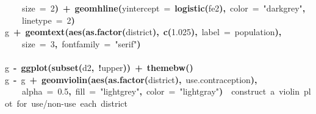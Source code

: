 \documentclass{article}
\makeatletter
\newcommand{\hlnumber}[1]{\textcolor[rgb]{0,0,0}{#1}}%
\newcommand{\hlfunctioncall}[1]{\textcolor[rgb]{.5,0,.33}{\textbf{#1}}}%
\newcommand{\hlstring}[1]{\textcolor[rgb]{.6,.6,1}{#1}}%
\newcommand{\hlkeyword}[1]{\textbf{#1}}%
\newcommand{\hlargument}[1]{\textcolor[rgb]{.69,.25,.02}{#1}}%
\newcommand{\hlcomment}[1]{\textcolor[rgb]{.18,.6,.34}{#1}}%
\newcommand{\hlassignement}[1]{\textbf{#1}}%
\newcommand{\hlsymbol}[1]{#1}%
\newcommand{\hlstd}[1]{\textcolor[rgb]{0,0,0}{#1}}%
\newenvironment{kframe}{%
 \def\FrameCommand##1{\hskip\@totalleftmargin \hskip-\fboxsep
 \colorbox{shadecolor}{##1}\hskip-\fboxsep
     \hskip-\linewidth \hskip-\@totalleftmargin \hskip\columnwidth}%
 \MakeFramed {\advance\hsize-\width
   \@totalleftmargin\z@ \linewidth\hsize
   \@setminipage}}%
 {\par\unskip\endMakeFramed}
\newenvironment{knitrout}{}{} %
\makeatother
\begin{document}
\begin{knitrout}
{\begin{kframe}
\begin{flushleft}
\hlstd{}{\ }{\ }{\ }{\ }\hlargument{size}{\ }\hlargument{=}{\ }\hlnumber{2}\hlkeyword{)}{\ }\hlkeyword{+}{\ }\hlfunctioncall{geom\usebox{\hlnormalsizeboxunderscore}hline}\hlkeyword{(}\hlargument{yintercept}{\ }\hlargument{=}{\ }\hlfunctioncall{logistic}\hlkeyword{(}\hlsymbol{fe2}\hlkeyword{)}\hlkeyword{,}{\ }\hlargument{color}{\ }\hlargument{=}{\ }\hlstring{"{}darkgrey"{}}\hlkeyword{,}\hspace*{\fill}\\
\hlstd{}{\ }{\ }{\ }{\ }\hlargument{linetype}{\ }\hlargument{=}{\ }\hlnumber{2}\hlkeyword{)}\hspace*{\fill}\\
\hlstd{}\hlsymbol{g}{\ }\hlkeyword{+}{\ }\hlfunctioncall{geom\usebox{\hlnormalsizeboxunderscore}text}\hlkeyword{(}\hlfunctioncall{aes}\hlkeyword{(}\hlfunctioncall{as.factor}\hlkeyword{(}\hlsymbol{district}\hlkeyword{)}\hlkeyword{,}{\ }\hlfunctioncall{c}\hlkeyword{(}\hlnumber{1.025}\hlkeyword{)}\hlkeyword{,}{\ }\hlargument{label}{\ }\hlargument{=}{\ }\hlsymbol{population}\hlkeyword{)}\hlkeyword{,}\hspace*{\fill}\\
\hlstd{}{\ }{\ }{\ }{\ }\hlargument{size}{\ }\hlargument{=}{\ }\hlnumber{3}\hlkeyword{,}{\ }\hlargument{fontfamily}{\ }\hlargument{=}{\ }\hlstring{"{}serif"{}}\hlkeyword{)}\hspace*{\fill}\\
\hlstd{}\hspace*{\fill}\\
\hlstd{}\hlsymbol{g}{\ }\hlassignement{\usebox{\hlnormalsizeboxlessthan}-}{\ }\hlfunctioncall{ggplot}\hlkeyword{(}\hlfunctioncall{subset}\hlkeyword{(}\hlsymbol{d2}\hlkeyword{,}{\ }\hlkeyword{!}\hlsymbol{upper}\hlkeyword{)}\hlkeyword{)}{\ }\hlkeyword{+}{\ }\hlfunctioncall{theme\usebox{\hlnormalsizeboxunderscore}bw}\hlkeyword{(}\hlkeyword{)}\hspace*{\fill}\\
\hlstd{}\hlsymbol{g}{\ }\hlassignement{\usebox{\hlnormalsizeboxlessthan}-}{\ }\hlsymbol{g}{\ }\hlkeyword{+}{\ }\hlfunctioncall{geom\usebox{\hlnormalsizeboxunderscore}violin}\hlkeyword{(}\hlfunctioncall{aes}\hlkeyword{(}\hlfunctioncall{as.factor}\hlkeyword{(}\hlsymbol{district}\hlkeyword{)}\hlkeyword{,}{\ }\hlsymbol{use.contraception}\hlkeyword{)}\hlkeyword{,}\hspace*{\fill}\\
\hlstd{}{\ }{\ }{\ }{\ }\hlargument{alpha}{\ }\hlargument{=}{\ }\hlnumber{0.5}\hlkeyword{,}{\ }\hlargument{fill}{\ }\hlargument{=}{\ }\hlstring{"{}lightgrey"{}}\hlkeyword{,}{\ }\hlargument{color}{\ }\hlargument{=}{\ }\hlstring{"{}lightgray"{}}\hlkeyword{)}{\ }{\ }\hlcomment{\usebox{\hlnormalsizeboxhash}\usebox{\hlnormalsizeboxhash}{\ }construct{\ }a{\ }violin{\ }plot{\ }for{\ }use/non-use{\ }each{\ }district}\hspace*{\fill}\\

\end{flushleft}
\end{kframe}}
\end{knitrout}
\end{document}
